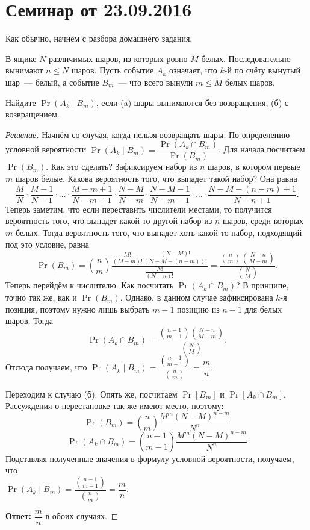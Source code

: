 \section{Семинар от 23.09.2016}
Как обычно, начнём с разбора домашнего задания.
\begin{problem}
    В ящике \(N\) различимых шаров, из которых ровно \(M\) белых. Последовательно вынимают \(n \leq N\) шаров. Пусть событие \(A_k\) означает, что \(k\)-й по счёту вынутый шар~--- белый, а событие \(B_m\)~--- что всего вынули \(m \leq M\) белых шаров. 
    
    Найдите \(\Pr(A_k \mid B_m)\), если (a) шары вынимаются без возвращения, (б) с возвращением.
\end{problem}
\begin{proof}[Решение]
    Начнём со случая, когда нельзя возвращать шары. По определению условной вероятности \(\Pr(A_k \mid B_m) = \dfrac{\Pr(A_k \cap B_m)}{\Pr(B_m)}\). Для начала посчитаем \(\Pr(B_m)\). Как это сделать? Зафиксируем набор из \(n\) шаров, в котором первые \(m\) шаров белые. Какова вероятность того, что выпадет такой набор? Она равна \[\frac{M}{N}\cdot\frac{M - 1}{N - 1}\cdot\ldots\cdot\frac{M - m + 1}{N - m + 1}\cdot\frac{N - M}{N - m}\cdot\frac{N - M - 1}{N - m - 1}\cdot\ldots\cdot\frac{N - M - (n - m) + 1}{N - n + 1}.\] Теперь заметим, что если переставить числители местами, то получится вероятность того, что выпадет какой-то другой набор из \(n\) шаров, среди которых \(m\) белых. Тогда вероятность того, что выпадет хоть какой-то набор, подходящий под это условие, равна \[\Pr(B_m) = \binom{n}{m}\frac{\frac{M!}{(M - m)!}\frac{(N - M)!}{(N - M - (n - m))!}}{\frac{N!}{(N - n)!}} = \frac{\binom{n}{m}\binom{N - n}{M - m}}{\binom{N}{M}}.\]
    Теперь перейдём к числителю. Как посчитать \(\Pr(A_k \cap B_m)\)? В принципе, точно так же, как и \(\Pr(B_m)\). Однако, в данном случае зафиксирована \(k\)-я позиция, поэтому нужно лишь выбрать \(m - 1\) позицию из \(n - 1\) для белых шаров. Тогда \[\Pr(A_k \cap B_m) = \frac{\binom{n - 1}{m - 1}\binom{N - n}{M - m}}{\binom{N}{M}}.\]
    Отсюда получаем, что \(\Pr(A_k \mid B_m) = \dfrac{\binom{n - 1}{m - 1}}{\binom{n}{m}} = \dfrac{m}{n}\).
    
    Переходим к случаю (б). Опять же, посчитаем \(\Pr[B_m]\) и \(\Pr[A_k \cap B_m]\). Рассуждения о перестановке так же имеют место, поэтому:
    \[\Pr(B_m) = \binom{n}{m}\frac{M^{m}(N - M)^{n - m}}{N^n}\]
    \[\Pr(A_k \cap B_m) = \binom{n - 1}{m - 1}\frac{M^{m}(N - M)^{n - m}}{N^n}\]
    Подставляя полученные значения в формулу условной вероятности, получаем, что \\ \(\Pr(A_k \mid B_m) = \dfrac{\binom{n - 1}{m - 1}}{\binom{n}{m}} = \dfrac{m}{n}\).
    
    \textbf{Ответ:} \(\dfrac{m}{n}\) в обоих случаях.
\end{proof}

